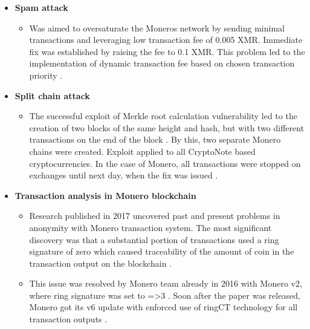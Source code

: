 \documentclass[
  printed, %
  table,   %
  nolof,     %
  nolot,     %
           oneside, color
]{fithesis3}
\begin{document}
\begin{itemize}
\item \textbf{Spam attack}
\begin{itemize}
\item Was aimed to oversaturate the Moneros network by sending minimal transactions and leveraging low transaction fee of 0.005 XMR. Immediate fix was established by raising the fee to 0.1 XMR. This problem led to the implementation of dynamic transaction fee based on chosen transaction priority \cite{monerospamattack}.
\end{itemize}
\item \textbf{Split chain attack}
\begin{itemize}
\item The successful exploit of Merkle root calculation vulnerability led to the creation of two blocks of the same height and hash, but with two different transactions on the end of the block \cite{macheta2014counterfeiting}. By this, two separate Monero chains were created. Exploit applied to all CryptoNote based cryptocurrencies. In the case of Monero, all transactions were stopped on exchanges until next day, when the fix was issued \cite{cryptonotemerkletree}.
\end{itemize}
\item \textbf{Transaction analysis in Monero blockchain}
\begin{itemize}
\item Research published in 2017 uncovered past and present problems in anonymity with Monero transaction system. The most significant discovery was that a substantial portion of transactions used a ring signature of zero which caused traceability of the amount of coin in the transaction output on the blockchain \cite{moser2018empirical}.
\item This issue was resolved by Monero team already in 2016 with Monero v2, where ring signature was set to =>3 \cite{monerov2release}. Soon after the paper was released, Monero got its v6 update with enforced use of ringCT technology for all transaction outputs \cite{monerov6release}.
\end{itemize}
\end{itemize}
\newpage
\end{document}
